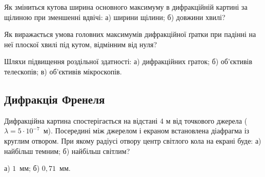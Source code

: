 \begin{problem}%
    Як зміниться кутова ширина основного максимуму в дифракційній
    картині за щілиною при зменшенні вдвічі: а) ширини щілини; б)
    довжини хвилі?
\end{problem}



\begin{problem}%
    Як виражається умова головних максимумів дифракційної ґратки при
    падінні на неї плоскої хвилі під кутом, відмінним від нуля?
\end{problem}


\begin{problem}%
    Шляхи підвищення роздільної здатності: а) дифракційних граток; б)
    об'єктивів телескопів; в) об'єктивів мікроскопів.
\end{problem}





\subsection*{Дифракція Френеля}


\begin{problem}%
    Дифракційна картина спостерігається на відстані 4 м від точкового
    джерела ($\lambda = 5\cdot10^{-7}$~м). Посередині між джерелом і екраном встановлена діафрагма із круглим отвором. При якому радіусі отвору центр світлого кола на екрані буде: а) найбільш темним; б) найбільш світлим?
    \begin{solution}
        а) $ 1 $~мм; б) $ 0,71 $~мм.
    \end{solution}
\end{problem}


